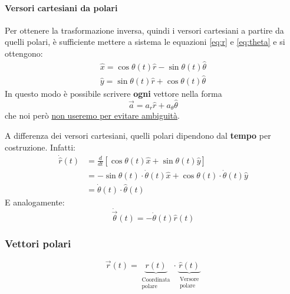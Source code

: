 \paragraph{Versori cartesiani da polari} Per ottenere la trasformazione inversa, quindi i versori cartesiani a partire da quelli polari, è sufficiente mettere a sistema le equazioni \ref{eq:r} e \ref{eq:theta} e si ottengono:
\begin{align}
	\widehat{x} = \cos\theta(t)\widehat{r} - \sin\theta(t)\widehat{\theta}\\
	\widehat{y} = \sin\theta(t)\widehat{r} + \cos\theta(t)\widehat{\theta}
\end{align}
In questo modo è possibile scrivere \textbf{ogni} vettore nella forma
\begin{equation}
	\vec{a} = a_r \widehat{r} + a_\theta \widehat{\theta}
\end{equation}
che noi però \underline{non useremo per evitare ambiguità}.

\begin{observation}
	A differenza dei versori cartesiani, quelli polari dipendono dal \textbf{tempo} per costruzione. Infatti:
	\begin{equation}
		\begin{split}
			\dot{\widehat{r}}(t) & = \frac{d}{dt}[\cos\theta(t)\widehat{x}+\sin\theta(t)\widehat{y}] \\
			& = - \sin\theta(t)\cdot\dot{\theta}(t)\widehat{x}+\cos\theta(t)\cdot\dot{\theta}(t)\widehat{y} \\
			& = \dot{\theta}(t)\cdot\widehat{\theta}(t)
		\end{split}
	\end{equation}
	E analogamente:
	\begin{equation}
		\dot{\vec{\theta}}(t) = -\dot{\theta}(t)\widehat{r}(t)
	\end{equation}
\end{observation}

\subsubsection{Vettori polari}
\label{sec:vettoripol}
\begin{equation}
	\vec{r}(t) = \underbrace{r(t)}_{\substack{\text{Coordinata}\\\text{polare}}}\cdot \underbrace{\widehat{r}(t)}_{\substack{\text{Versore}\\\text{polare}}}
\end{equation}

